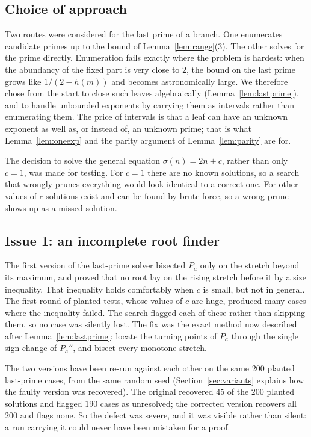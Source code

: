 \documentclass[11pt]{amsart}
\theoremstyle{remark}
\begin{document}
\subsection{Choice of approach}
Two routes were considered for the last prime of a branch. One enumerates
candidate primes up to the bound of Lemma~\ref{lem:range}(3). The other solves
for the prime directly. Enumeration fails exactly where the problem is hardest:
when the abundancy of the fixed part is very close to $2$, the bound on the last
prime grows like $1/(2 - h(m))$ and becomes astronomically large. We therefore
chose from the start to close such leaves algebraically
(Lemma~\ref{lem:lastprime}), and to handle unbounded exponents by carrying them
as intervals rather than enumerating them. The price of intervals is that a leaf
can have an unknown exponent as well as, or instead of, an unknown prime; that
is what Lemma~\ref{lem:oneexp} and the parity argument of
Lemma~\ref{lem:parity} are for.

The decision to solve the general equation $\sigma(n) = 2n + c$, rather than
only $c = 1$, was made for testing. For $c = 1$ there are no known solutions, so
a search that wrongly prunes everything would look identical to a correct one.
For other values of $c$ solutions exist and can be found by brute force, so a
wrong prune shows up as a missed solution.

\subsection{Issue 1: an incomplete root finder}
The first version of the last-prime solver bisected $P_a$ only on the stretch
beyond its maximum, and proved that no root lay on the rising stretch before it
by a size inequality. That inequality holds comfortably when $c$ is small, but
not in general. The first round of planted tests, whose values of $c$ are huge,
produced many cases where the inequality failed. The search flagged each of
these rather than skipping them, so no case was silently lost. The fix was the
exact method now described after Lemma~\ref{lem:lastprime}: locate the turning
points of $P_a$ through the single sign change of $P_a''$, and bisect every
monotone stretch.

The two versions have been re-run against each other on the same $200$ planted
last-prime cases, from the same random seed
(Section~\ref{sec:variants} explains how the faulty version was recovered). The
original recovered $45$ of the $200$ planted solutions and flagged $190$ cases
as unresolved; the corrected version recovers all $200$ and flags none. So the
defect was severe, and it was visible rather than silent: a run carrying it could
never have been mistaken for a proof.
\end{document}
